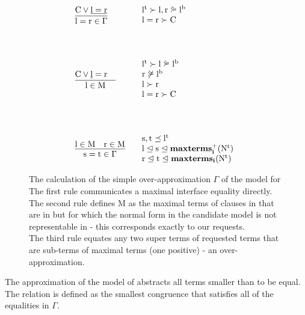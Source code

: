 \begin{figure}
\[
\begin{array}{llll}
	\vcenter{
		\infer[]
		{\m{l=r \in \Gamma}}
		{
			\m{C \lor \underline{l=r}}
		}
	}&
			\begin{array}{ll}
				\m{l^t \succ l,r \curlyeqsucc l^b}\\
				\m{l=r \succ C}
			\end{array}\\	
	
	\vspace{1cm}
	\\
	\vcenter{
		\infer[]
		{\m{l \in M}}
		{
			\m{C \lor \underline{l}=r} &
		}
	}&
	\begin{array}{ll}
		\m{l^t \succ l \curlyeqsucc l^b}\\
		\m{r \not\curlyeqsucc l^b}\\
		\m{l \succ r}\\
		\m{l=r \succ C}
	\end{array}\\	
	
	\vspace{1cm}
	\\
\vcenter{
	\infer[]
	{\m{s = t \in \Gamma}}
	{
		\m{l \in M} & 
		\m{r \in M}
	}
}	&
	\begin{array}{ll}
		\m{s,t \preceq l^t}\\
		\m{l \trianglelefteq s \trianglelefteq \maxTermsip{N^t}}\\
		\m{r \trianglelefteq t \trianglelefteq \maxTermsi{N^t}}
	\end{array}\\	
\end{array}
\]
\caption{
The calculation of the simple over-approximation $\Gamma$ of the model for \\
The first rule communicates a maximal interface equality directly.\\
The second rule defines M as the maximal terms of clauses in  that are in \langI{} but for which the normal form in the candidate model is not representable in \langI - this corresponds exactly to our requests.\\
The third rule equates any two super terms of requested terms that are sub-terms of maximal terms (one positive) - an over-approximation.
}
\label{SP_P}
\end{figure}

\noindent
The approximation of the model of  abstracts all terms smaller than  to be equal.\\
The relation \m{\textcolor{blue}{\eqg}} is defined as the smallest congruence that satisfies all of the equalities in $\Gamma$.

